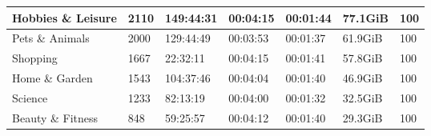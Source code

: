 \begin{table}[]
\begin{tabular}{l|l|l|l|l|l|l}
Hobbies \& Leisure                                 & 2110                                                & 149:44:31                                                & 00:04:15                                                & 00:01:44                                               & 77.1GiB                                              & 100                                                           \\ \hline
Pets \& Animals                                    & 2000                                                & 129:44:49                                                & 00:03:53                                                & 00:01:37                                               & 61.9GiB                                              & 100                                                           \\ \hline
Shopping                                           & 1667                                                & 22:32:11                                                 & 00:04:15                                                & 00:01:41                                               & 57.8GiB                                              & 100                                                           \\ \hline
Home \& Garden                                     & 1543                                                & 104:37:46                                                & 00:04:04                                                & 00:01:40                                               & 46.9GiB                                              & 100                                                           \\ \hline
Science                                            & 1233                                                & 82:13:19                                                 & 00:04:00                                                & 00:01:32                                               & 32.5GiB                                              & 100                                                           \\ \hline
Beauty \& Fitness                                  & 848                                                 & 59:25:57                                                 & 00:04:12                                                & 00:01:40                                               & 29.3GiB                                              & 100                                                           \\ \hline

\end{tabular}
\end{table}
